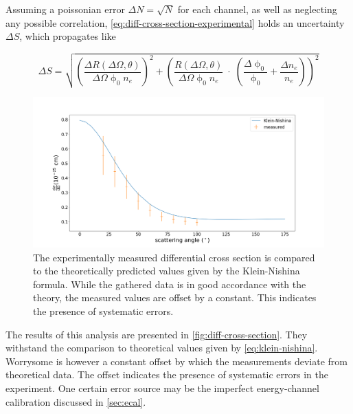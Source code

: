 Assuming a poissonian error $\Delta N = \sqrt{N}$ for each channel, as well as
neglecting any possible correlation, \autoref{eq:diff-cross-section-experimental}
holds an uncertainty $\Delta S$, which propagates like

\begin{equation}
\label{eq:cross-section-error}
	\Delta S = \sqrt{ \left(\frac{\Delta R(\Delta\Omega,\theta)}{\Delta\Omega\upphi_0 n_e} \right)^2 + \left(\frac{R(\Delta\Omega,\theta)}{\Delta\Omega\upphi_0 n_e}\;\cdot\;(\frac{\Delta\upphi_0}{\upphi_0} + \frac{\Delta n_e}{n_e} ) \right)^2 }
\end{equation}

\begin{figure}
	\centering
	\includegraphics[width=1.0\textwidth]{./fig/differential-cross-section.png}
	\caption{The experimentally measured differential cross section is compared
	to the theoretically predicted values given by the Klein-Nishina formula.
	While the gathered data is in good accordance with the theory, the measured
	values are offset by a constant. This indicates the presence of systematic
	errors.}
	\label{fig:diff-cross-section}
\end{figure}

The results of this analysis are presented in \autoref{fig:diff-cross-section}. They
withstand the comparison to theoretical values given by \autoref{eq:klein-nishina}.
Worrysome is however a constant offset by which the measurements deviate from
theoretical data. The offset indicates the presence of systematic errors in the
experiment. One certain error source may be the imperfect energy-channel calibration
discussed in \autoref{sec:ecal}.
